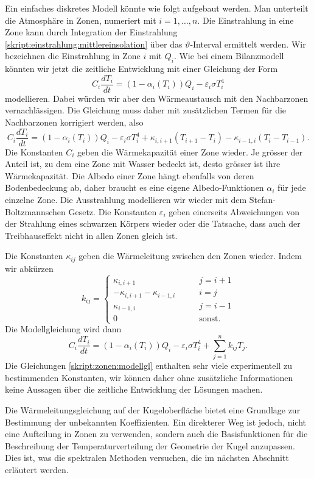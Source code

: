 Ein einfaches diskretes Modell könnte wie folgt aufgebaut werden.
Man unterteilt die Atmosphäre in Zonen, numeriert mit $i=1,\dots,n$.
Die Einstrahlung in eine Zone kann durch Integration der Einstrahlung
\eqref{skript:einstrahlung:mittlereinsolation}
über das $\vartheta$-Interval ermittelt werden.
Wir bezeichnen die Einstrahlung in Zone $i$ mit $Q_i$.
Wie bei einem Bilanzmodell könnten wir jetzt die zeitliche
Entwicklung mit einer Gleichung der Form
\[
C_i\frac{dT_i}{dt}
=
(1-\alpha_i(T_i)) Q_i - \varepsilon_i \sigma T_i^4
\]
modellieren.
Dabei würden wir aber den Wärmeaustausch mit den Nachbarzonen
vernachlässigen.
Die Gleichung muss daher mit zusätzlichen Termen für die Nachbarzonen
korrigiert werden, also
\begin{equation}
C_i\frac{dT_i}{dt}
=
(1-\alpha_i(T_i)) Q_i - \varepsilon_i \sigma T_i^4
+
\kappa_{i,i+1} (T_{i+1}-T_i)
-
\kappa_{i-1,i} (T_i-T_{i-1}).
\end{equation}
Die Konstanten $C_i$ geben die Wärmekapazität einer Zone wieder.
Je grösser der Anteil ist, zu dem eine Zone mit Wasser bedeckt ist,
desto grösser ist ihre Wärmekapazität.
Die Albedo einer Zone hängt ebenfalls von deren Bodenbedeckung ab, 
daher braucht es eine eigene Albedo-Funktionen $\alpha_i$ für jede
einzelne Zone.
Die Ausstrahlung modellieren wir wieder mit dem Stefan-Boltzmannschen
Gesetz.
Die Konstanten $\varepsilon_i$ geben einerseits Abweichungen von
der Strahlung eines schwarzen Körpers wieder oder die Tatsache, dass
auch der Treibhauseffekt nicht in allen Zonen gleich ist.

Die Konstanten $\kappa_{ij}$ geben die Wärmeleitung zwischen den
Zonen wieder.
Indem wir abkürzen
\[
k_{ij}
=
\begin{cases}
\kappa_{i,i+1}&\qquad j=i+1
\\
-\kappa_{i,i+1}-\kappa_{i-1,i}&\qquad i=j
\\
\kappa_{i-1,i}&\qquad j=i-1
\\
0&\qquad\text{sonst.}
\end{cases}
\]
Die Modellgleichung wird dann
\begin{equation}
C_i \frac{dT_i}{dt}
=
(1-\alpha_i(T_i)) Q_i - \varepsilon_i \sigma T_i^4
+
\sum_{j=1}^n k_{ij}T_j.
\label{skript:zonen:modellgl}
\end{equation}
Die Gleichungen
\eqref{skript:zonen:modellgl}
enthalten sehr viele experimentell zu bestimmenden Konstanten,
wir können daher ohne zusätzliche Informationen keine Aussagen
über die zeitliche Entwicklung der Lösungen machen.

Die Wärmeleitungsgleichung auf der Kugeloberfläche bietet eine
Grundlage zur Bestimmung der unbekannten Koeffizienten.
Ein direkterer Weg ist jedoch, nicht eine Aufteilung in Zonen
zu verwenden, sondern auch die Basisfunktionen für die Beschreibung
der Temperaturverteilung der Geometrie der Kugel anzupassen.
Dies ist, was die spektralen Methoden versuchen, die im nächsten
Abschnitt erläutert werden.

